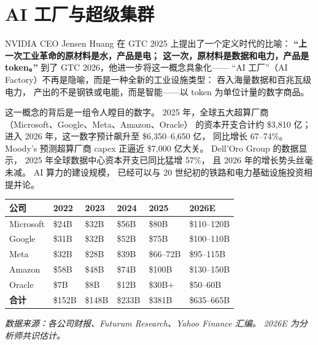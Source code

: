 
\section{AI 工厂与超级集群}
\label{sec:infra-factories}

NVIDIA CEO Jensen Huang 在 GTC 2025 上提出了一个定义时代的比喻：
\textbf{``上一次工业革命的原材料是水，产品是电；
这一次，原材料是数据和电力，产品是 token。''}
到了 GTC 2026，他进一步将这一概念具象化——
``AI 工厂''（AI Factory）不再是隐喻，而是一种全新的工业设施类型：
吞入海量数据和百兆瓦级电力，
产出的不是钢铁或电能，而是智能——以 token 为单位计量的数字商品。

这一概念的背后是一组令人瞠目的数字。
2025 年，全球五大超算厂商（Microsoft、Google、Meta、Amazon、Oracle）
的资本开支合计约 \$3,810 亿；
进入 2026 年，这一数字预计飙升至 \$6,350--6,650 亿，
同比增长 67--74\%。
Moody's 预测超算厂商 capex 正逼近 \$7,000 亿大关。
Dell'Oro Group 的数据显示，
2025 年全球数据中心资本开支已同比猛增 57\%，
且 2026 年的增长势头丝毫未减。
AI 算力的建设规模，
已经可以与 20 世纪初的铁路和电力基础设施投资相提并论。

\begin{keybox}[全球超算厂商资本开支演进（2022--2026E）]
\small
\renewcommand{\arraystretch}{1.3}
\begin{tabularx}{\linewidth}{lXXXXX}
\toprule
\rowcolor{figLightGray}
\textbf{公司} & \textbf{2022} & \textbf{2023} & \textbf{2024} & \textbf{2025} & \textbf{2026E} \\
\midrule
Microsoft   & \$24B  & \$32B  & \$56B  & \$80B   & \$110--120B \\
Google      & \$31B  & \$32B  & \$52B  & \$75B   & \$100--110B \\
Meta        & \$32B  & \$28B  & \$39B  & \$66--72B & \$95--115B \\
Amazon      & \$58B  & \$48B  & \$74B  & \$100B  & \$130--150B \\
Oracle      & \$7B   & \$8B   & \$12B  & \$30B+  & \$50--60B \\
\midrule
\textbf{合计} & \$152B & \$148B & \$233B & \$381B & \$635--665B \\
\bottomrule
\end{tabularx}

\vspace{4pt}
\noindent\textit{数据来源：各公司财报、Futurum Research、Yahoo Finance 汇编。
2026E 为分析师共识估计。}
\end{keybox}

